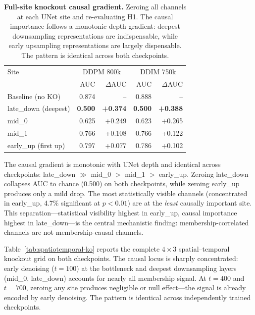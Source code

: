 \documentclass[10pt,conference]{IEEEtran}
\begin{document}
\begin{table}[t]
\centering
\caption{\textbf{Full-site knockout causal gradient.} Zeroing all channels at
each UNet site and re-evaluating H1. The causal importance follows a monotonic
depth gradient: deepest downsampling representations are indispensable, while
early upsampling representations are largely dispensable. The pattern is
identical across both checkpoints.}
\label{tab:full-site-ko}
\centering
\begin{tabular}{lrrrr}
\toprule
Site & \multicolumn{2}{c}{DDPM 800k} & \multicolumn{2}{c}{DDIM 750k} \\
& AUC & $\Delta$AUC & AUC & $\Delta$AUC \\
\midrule
Baseline (no KO) & 0.874 & -- & 0.888 & -- \\
late\_down (deepest) & \textbf{0.500} & \textbf{+0.374} & \textbf{0.500} & \textbf{+0.388} \\
mid\_0 & 0.625 & +0.249 & 0.623 & +0.265 \\
mid\_1 & 0.766 & +0.108 & 0.766 & +0.122 \\
early\_up (first up) & 0.797 & +0.077 & 0.786 & +0.102 \\
\bottomrule
\end{tabular}
\end{table}

The causal gradient is monotonic with UNet depth and identical across
checkpoints: late\_down $\gg$ mid\_0 $>$ mid\_1 $>$ early\_up. Zeroing
late\_down collapses AUC to chance (0.500) on both checkpoints, while
zeroing early\_up produces only a mild drop. The most statistically
visible channels (concentrated in early\_up, 4.7\% significant at
$p{<}0.01$) are at the \emph{least} causally important site. This
separation---statistical visibility highest in early\_up, causal
importance highest in late\_down---is the central mechanistic finding:
membership-correlated channels are not membership-causal channels.

Table~\ref{tab:spatiotemporal-ko} reports the complete $4{\times}3$
spatial--temporal knockout grid on both checkpoints. The causal locus is
sharply concentrated: early denoising ($t{=}100$) at the bottleneck and
deepest downsampling layers (mid\_0, late\_down) accounts for
nearly all membership signal. At $t{=}400$ and $t{=}700$, zeroing any
site produces negligible or null effect---the signal is already encoded
by early denoising. The pattern is identical across independently trained
checkpoints.
\end{document}
